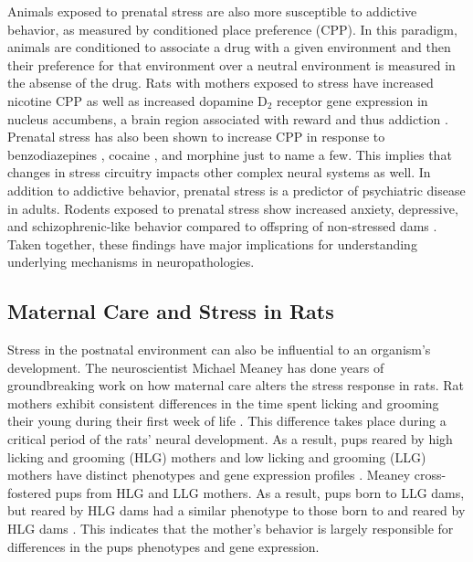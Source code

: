 \documentclass[12pt,twoside]{reedthesis}
\begin{document}
 Animals exposed to prenatal stress are also more susceptible to addictive
 behavior, as measured by conditioned place preference (CPP). In this paradigm,
 animals are conditioned to associate a drug with a given environment and then
 their preference for that environment over a neutral environment is measured in
 the absense of the drug.
 Rats with mothers exposed to stress have increased nicotine CPP as well as increased dopamine D$_2$ receptor gene expression
 in nucleus accumbens, a brain region associated with reward and thus addiction \citep{said_prenatal_2015}. Prenatal stress has also been shown to
 increase CPP in response to benzodiazepines \citep{lakehayli_prenatal_2015}, cocaine
 \citep{pastor_prenatal_2018}, and morphine \citep{vey_stress_2016} just to name
 a few. This implies that changes in stress circuitry impacts other complex
 neural systems as well. In addition to addictive behavior, prenatal stress is a predictor of psychiatric disease in adults.
 Rodents exposed to prenatal stress show increased anxiety, depressive, and
 schizophrenic-like behavior compared to offspring of non-stressed dams
 \citep{weinstock_prenatal_2017}. Taken together, these findings have major
 implications for understanding underlying mechanisms in neuropathologies.

 \subsection{Maternal Care and Stress in Rats}
  
Stress in the postnatal
environment can also be influential to an organism's development. The
neuroscientist Michael Meaney has done years of groundbreaking work on how maternal
care alters the stress response in rats.  Rat mothers exhibit consistent differences in the time spent licking and grooming
their young during their first week of life \citep{meaney_early_1996}. This difference takes place during a critical period
of the rats' neural development. As a result, pups reared by high licking and grooming
(HLG) mothers and low licking and grooming (LLG) mothers have distinct
phenotypes and gene expression profiles \citep{weaver_epigenetic_2004}. Meaney cross-fostered pups from HLG and
LLG mothers. As a result, pups born to LLG dams, but reared by HLG dams had a
similar phenotype to those born to and reared by HLG dams
\citep{francis_nongenomic_1999}. This indicates that the mother's behavior is
largely responsible for differences in the pups phenotypes and gene expression.
\end{document}
